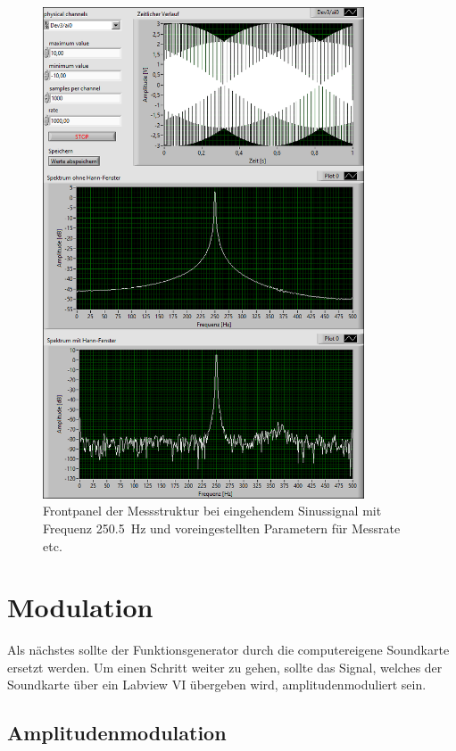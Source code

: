 		\begin{figure}[H]
			\centering
			\includegraphics[width=0.85\textwidth]{pic/abtast_250,5Hz.png}	
			\caption{Frontpanel der Messstruktur bei eingehendem Sinussignal mit Frequenz \SI{250,5}{\hertz} und voreingestellten Parametern für Messrate etc.}
			\label{fig:abtast_250,5Hz}
		\end{figure}

\newpage
\section{Modulation}
	
	Als nächstes sollte der Funktionsgenerator durch die computereigene Soundkarte ersetzt werden.
	Um einen Schritt weiter zu gehen, sollte das Signal, welches der Soundkarte über ein Labview VI übergeben wird, amplitudenmoduliert sein.
	
	\subsection{Amplitudenmodulation}
	
